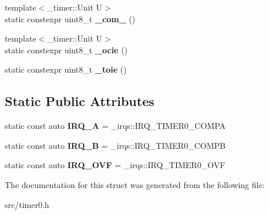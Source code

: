 \begin{DoxyCompactItemize}
{\footnotesize template$<$\+\_\+timer\+::\+Unit U$>$ }\\static constexpr uint8\+\_\+t {\bfseries \+\_\+com\+\_} ()
\item 
\hypertarget{struct__timer0_1_1TimerDef_a402e897dbe98439fb2697ab1c548f466}{}\label{struct__timer0_1_1TimerDef_a402e897dbe98439fb2697ab1c548f466} 
{\footnotesize template$<$\+\_\+timer\+::\+Unit U$>$ }\\static constexpr uint8\+\_\+t {\bfseries \+\_\+ocie} ()
\item 
\hypertarget{struct__timer0_1_1TimerDef_af0fae9725deecc5eba56c7fcbcee3d4e}{}\label{struct__timer0_1_1TimerDef_af0fae9725deecc5eba56c7fcbcee3d4e} 
static constexpr uint8\+\_\+t {\bfseries \+\_\+toie} ()
\end{DoxyCompactItemize}
\subsection*{Static Public Attributes}
\begin{DoxyCompactItemize}
\item 
\hypertarget{struct__timer0_1_1TimerDef_a6a025f30a176807a46e9a53e3ab81edb}{}\label{struct__timer0_1_1TimerDef_a6a025f30a176807a46e9a53e3ab81edb} 
static const auto {\bfseries I\+R\+Q\+\_\+A} = \+\_\+irqs\+::\+I\+R\+Q\+\_\+\+T\+I\+M\+E\+R0\+\_\+\+C\+O\+M\+PA
\item 
\hypertarget{struct__timer0_1_1TimerDef_adab020411a7f59b24e3d534bd8c58493}{}\label{struct__timer0_1_1TimerDef_adab020411a7f59b24e3d534bd8c58493} 
static const auto {\bfseries I\+R\+Q\+\_\+B} = \+\_\+irqs\+::\+I\+R\+Q\+\_\+\+T\+I\+M\+E\+R0\+\_\+\+C\+O\+M\+PB
\item 
\hypertarget{struct__timer0_1_1TimerDef_a482092f3baf313478d0fecb10c358e28}{}\label{struct__timer0_1_1TimerDef_a482092f3baf313478d0fecb10c358e28} 
static const auto {\bfseries I\+R\+Q\+\_\+\+O\+VF} = \+\_\+irqs\+::\+I\+R\+Q\+\_\+\+T\+I\+M\+E\+R0\+\_\+\+O\+VF
\end{DoxyCompactItemize}


The documentation for this struct was generated from the following file\+:\begin{DoxyCompactItemize}
\item 
src/timer0.\+h\end{DoxyCompactItemize}
